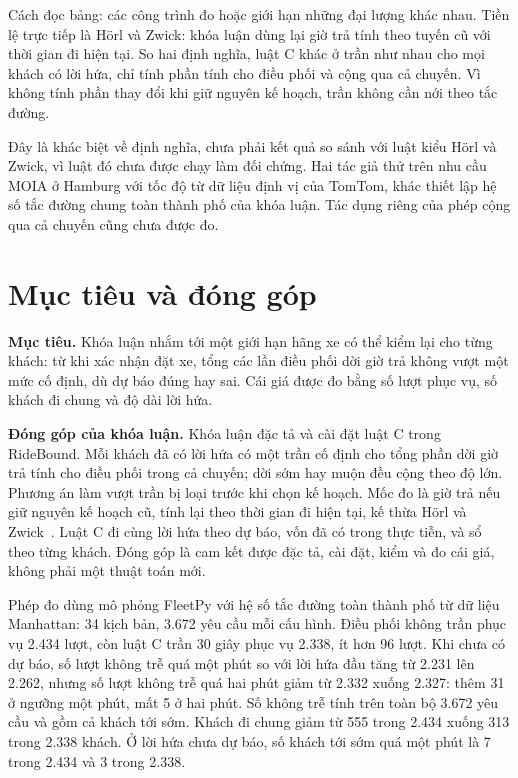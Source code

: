 Cách đọc bảng: các công trình đo hoặc giới hạn những đại lượng khác nhau. Tiền lệ trực tiếp là Hörl và
Zwick: khóa luận dùng lại giờ trả tính theo tuyến cũ với thời gian đi hiện tại. So hai định nghĩa, luật C
khác ở trần như nhau cho mọi khách có lời hứa, chỉ tính phần tính cho điều phối và cộng qua cả chuyến.
Vì không tính phần thay đổi khi giữ nguyên kế hoạch, trần không cần nới theo tắc đường.

Đây là khác biệt về định nghĩa, chưa phải kết quả so sánh với luật kiểu Hörl và Zwick, vì luật đó chưa được
chạy làm đối chứng. Hai tác giả thử trên nhu cầu MOIA ở Hamburg với tốc độ từ dữ liệu định vị của TomTom,
khác thiết lập hệ số tắc đường chung toàn thành phố của khóa luận. Tác dụng riêng của phép cộng qua cả
chuyến cũng chưa được đo.

\section{Mục tiêu và đóng góp}
\label{muc:c1-donggop}

\noindent\textbf{Mục tiêu.} Khóa luận nhắm tới một giới hạn hãng xe có thể kiểm lại cho từng khách: từ khi
xác nhận đặt xe, tổng các lần điều phối dời giờ trả không vượt một mức cố định, dù dự báo đúng hay sai.
Cái giá được đo bằng số lượt phục vụ, số khách đi chung và độ dài lời hứa.

\noindent\textbf{Đóng góp của khóa luận.} Khóa luận đặc tả và cài đặt luật C trong RideBound. Mỗi khách đã
có lời hứa có một trần cố định cho tổng phần dời giờ trả tính cho điều phối trong cả chuyến; dời sớm hay
muộn đều cộng theo độ lớn. Phương án làm vượt trần bị loại trước khi chọn kế hoạch. Mốc đo là giờ trả nếu
giữ nguyên kế hoạch cũ, tính lại theo thời gian đi hiện tại, kế thừa Hörl và Zwick~\cite{horl2022}.
Luật C đi cùng lời hứa theo dự báo, vốn đã có trong thực tiễn, và sổ theo từng khách. Đóng góp là cam kết
được đặc tả, cài đặt, kiểm và đo cái giá, không phải một thuật toán mới.

Phép đo dùng mô phỏng FleetPy với hệ số tắc đường toàn thành phố từ dữ liệu Manhattan: 34 kịch bản,
3.672 yêu cầu mỗi cấu hình. Điều phối không trần phục vụ 2.434 lượt, còn luật C trần 30 giây phục vụ
2.338, ít hơn 96 lượt. Khi chưa có dự báo, số lượt không trễ quá một phút so với lời hứa đầu tăng từ
2.231 lên 2.262, nhưng số lượt không trễ quá hai phút giảm từ 2.332 xuống 2.327: thêm 31 ở ngưỡng một
phút, mất 5 ở hai phút. Số không trễ tính trên toàn bộ 3.672 yêu cầu và gồm cả khách tới sớm. Khách đi chung giảm từ 555 trong 2.434 xuống 313 trong 2.338 khách.
Ở lời hứa chưa dự báo, số khách tới sớm quá một phút là 7 trong 2.434 và 3 trong 2.338.

